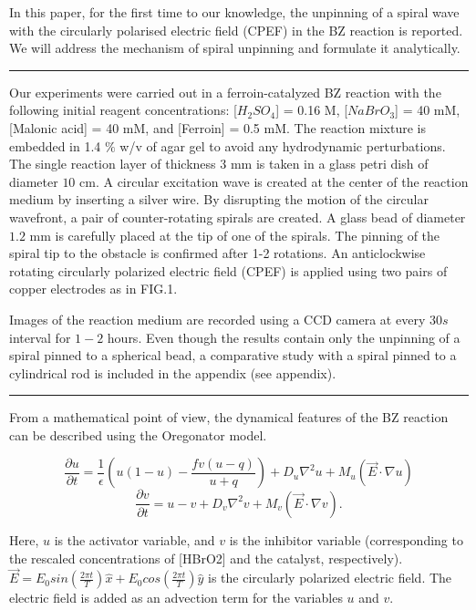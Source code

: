\documentclass[%
 preprint,
 amsmath,amssymb,
 aps,
]{revtex4-2}
\begin{document}
In this paper, for the first time to our knowledge, the unpinning of a spiral wave with the circularly polarised electric field (CPEF) in the BZ reaction is reported. We will address the mechanism of spiral unpinning and formulate it analytically.
 
\vspace{5pt}
\hrule
\vspace{5pt}


Our experiments were carried out in a ferroin-catalyzed BZ reaction with the following initial reagent concentrations: [$H_2SO_4$] = 0.16 M, [$NaBrO_3$] = 40 mM, [Malonic acid] = 40 mM, and [Ferroin] = 0.5 mM. The reaction mixture is embedded in 1.4 $\%$ w/v of agar gel to avoid any hydrodynamic perturbations. The single reaction layer of thickness $3$ mm is taken in a glass petri dish of diameter $10$ cm. 
A circular excitation wave is created at the center of the reaction medium by inserting a silver wire. By disrupting the motion of the circular wavefront, a pair of counter-rotating spirals are created. A glass bead of diameter $1.2$ mm is carefully placed at the tip of one of the spirals. The pinning of the spiral tip to the obstacle is confirmed after 1-2 rotations.
An anticlockwise rotating circularly polarized electric field (CPEF) is applied using two pairs of copper electrodes as in FIG.1. 

Images of the reaction medium are recorded using a CCD camera at every $30 s$ interval for $1-2$ hours. Even though the results contain only the unpinning of a spiral pinned to a spherical bead, a comparative study with a spiral pinned to a cylindrical rod is included in the appendix (see appendix).

\vspace{5pt}
\hrule
\vspace{5pt}

From a mathematical point of view, the dynamical features of the BZ reaction can be described using the Oregonator model. 

\begin{equation}\label{E_uoregonator}
\frac{\partial u}{\partial t}=\frac{1}{\epsilon}(u(1-u)-\frac{fv(u-q)}{u+q})
+D_{u}\nabla^2u+M_{u}(\vec{E} \cdot \nabla u)
\end{equation}
\begin{equation}\label{E_voregonator}
\frac{\partial v}{\partial t}=u-v+D_{v}\nabla^2v+M_{v}(\vec{E} \cdot \nabla v).
\end{equation}

Here, $u$ is the activator variable, and $v$ is the inhibitor variable (corresponding to the rescaled concentrations of [HBrO2] and the catalyst, respectively). $\vec{E} = E_{0} sin(\frac{2\pi t}{T})\hat{x} + E_{0} cos(\frac{2\pi t}{T})\hat{y}$ is the circularly polarized electric field. The electric field is added as an advection term for the variables $u$ and $v$. 
\end{document}
